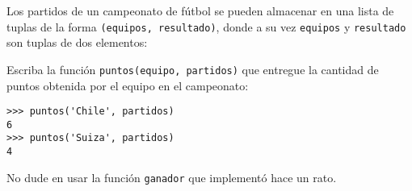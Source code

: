 Los partidos de un campeonato de fútbol
se pueden almacenar en una lista de tuplas de la forma \verb!(equipos, resultado)!,
donde a su vez \verb!equipos! y \verb!resultado!
son tuplas de dos elementos:


Escriba la función \verb!puntos(equipo, partidos)!
que entregue la cantidad de puntos obtenida por el equipo
en el campeonato:
\begin{lstlisting}
>>> puntos('Chile', partidos)
6
>>> puntos('Suiza', partidos)
4
\end{lstlisting}

No dude en usar la función \verb!ganador! que implementó hace un rato.
